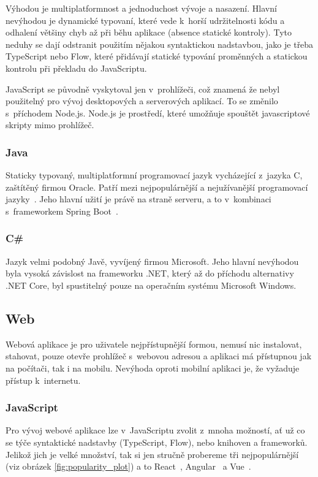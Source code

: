 Výhodou je multiplatformnost a jednoduchost vývoje a nasazení. Hlavní nevýhodou je dynamické typovaní, které vede k~horší udržitelnosti kódu a odhalení většiny chyb až při běhu aplikace (absence statické kontroly). Tyto neduhy se dají odstranit použitím nějakou syntaktickou nadstavbou, jako je třeba TypeScript nebo Flow, které přidávají statické typování proměnných a statickou kontrolu při překladu do JavaScriptu.

JavaScript se původně vyskytoval jen v~prohlížeči, což znamená že nebyl použitelný pro vývoj desktopových a serverových aplikací. To se změnilo s~příchodem Node.js. Node.js je prostředí, které umožňuje spouštět javascriptové skripty mimo prohlížeč.

\subsubsection*{Java}
Staticky typovaný, multiplatformní programovací jazyk vycházející z~jazyka C, zaštítěný firmou Oracle. Patří mezi nejpopulárnější a nejužívanější programovací jazyky~\cite{stackexchangeinc_2019_stack}. Jeho hlavní užití je právě na straně serveru, a to v~kombinaci s~frameworkem Spring Boot~\cite{jetbrainssro_2019_demographics}.

\subsubsection*{C\# }
Jazyk velmi podobný Javě, vyvíjený firmou Microsoft. Jeho hlavní nevýhodou byla vysoká závislost na frameworku .NET, který až do příchodu alternativy .NET Core, byl spustitelný pouze na operačním systému Microsoft Windows.

\subsection{Web}
\label{ss:web}
Webová aplikace je pro uživatele nejpřístupnější formou, nemusí nic instalovat, stahovat, pouze otevře prohlížeč s~webovou adresou a aplikaci má přístupnou jak na počítači, tak i na mobilu. Nevýhoda oproti mobilní aplikaci je, že vyžaduje přístup k~internetu.

\subsubsection*{JavaScript}
\label{ss:javascript}
Pro vývoj webové aplikace lze v~JavaScriptu zvolit z~mnoha možností, ať už co se týče syntaktické nadstavby (TypeScript, Flow), nebo knihoven a frameworků. Jelikož jich je velké množství, tak si jen stručně probereme tři nejpopulárnější (viz obrázek \ref{fig:popularity_plot}) a to React~\cite{facebookinc_2019_react}, Angular~\cite{googlellc_2019_angular} a Vue~\cite{you_2014_vuejs}.

